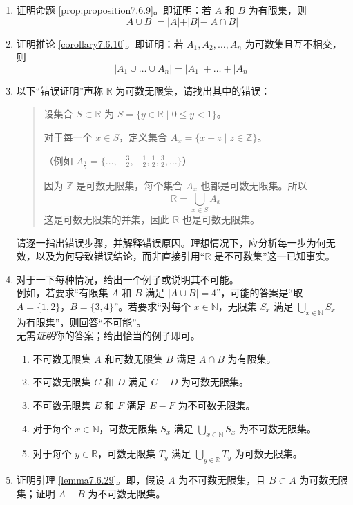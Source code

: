 \begin{enumerate}[label=(\arabic*)]
    \item 证明命题 \ref{prop:proposition7.6.9}。即证明：若 $A$ 和 $B$ 为有限集，则
          \[A \cup B| = |A| + |B| - |A \cap B|\] \label{exc:exercises7.6.1}
    \item 证明推论 \ref{corollary7.6.10}。即证明：若 $A_1, A_2, \dots, A_n$ 为可数集且互不相交，则
          \[|A_1 \cup \dots \cup A_n| = |A_1| + \dots + |A_n|\]\label{exc:exercises7.6.2}
    \item 以下``错误证明''声称 $\mathbb{R}$ 为可数无限集，请找出其中的错误：
          \begin{quote}
              \begin{spoof}
                  设集合 $S \subset \mathbb{R}$ 为 $S = \{y \in \mathbb{R} \mid 0 \le y < 1\}$。

                  对于每一个 $x \in S$，定义集合 $A_x = \{x + z \mid z \in \mathbb{Z}\}$。

                  （例如 $A_\frac{1}{2} = \{\dots, -\frac{3}{2}, -\frac{1}{2}, \frac{1}{2}, \frac{3}{2}, \dots\}$）

                  因为 $\mathbb{Z}$ 是可数无限集，每个集合 $A_x$ 也都是可数无限集。所以
                  \[\mathbb{R} = \bigcup_{x \in S} A_x\]
                  这是可数无限集的并集，因此 $\mathbb{R}$ 也是可数无限集。
              \end{spoof}
          \end{quote}
          请逐一指出错误步骤，并解释错误原因。理想情况下，应分析每一步为何无效，以及为何导致错误结论，而非直接引用``$\mathbb{R}$ 是不可数集''这一已知事实。
    \item 对于一下每种情况，给出一个例子或说明其不可能。\\
          例如，若要求``有限集 $A$ 和 $B$ 满足 $|A \cup B| = 4$''，可能的答案是``取 $A=\{1,2\}$，$B=\{3,4\}$''。若要求``对每个 $x \in \mathbb{N}$，无限集 $S_x$ 满足 $\displaystyle\bigcup_{x \in \mathbb{N}} S_x$ 为有限集''，则回答``不可能''。\\
          无需\emph{证明}你的答案；给出恰当的例子即可。
          \begin{enumerate}[label=(\alph*)]
              \item 不可数无限集 $A$ 和可数无限集 $B$ 满足 $A \cap B$ 为有限集。
              \item 不可数无限集 $C$ 和 $D$ 满足 $C-D$ 为可数无限集。
              \item 不可数无限集 $E$ 和 $F$ 满足 $E-F$ 为不可数无限集。
              \item 对于每个 $x \in \mathbb{N}$，可数无限集 $S_x$ 满足 $\displaystyle\bigcup_{x \in \mathbb{N}} S_x$ 为不可数无限集。
              \item 对于每个 $y \in \mathbb{R}$，可数无限集 $T_y$ 满足 $\displaystyle\bigcup_{y \in \mathbb{R}} T_y$ 为可数无限集。
          \end{enumerate}
    \item 证明引理 \ref{lemma7.6.29}。即，假设 $A$ 为不可数无限集，且 $B \subset A$ 为可数无限集；证明 $A-B$ 为不可数无限集。\label{exc:exercises7.6.5}
\end{enumerate}
